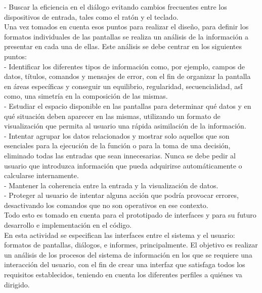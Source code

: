 -	Buscar la eficiencia en el diálogo evitando cambios frecuentes entre los dispositivos de entrada, tales como el ratón y el teclado.\\

\noindent Una vez tomados en cuenta esos puntos para realizar el diseño, para definir los formatos individuales de las pantallas se realiza un análisis de la información a presentar en cada una de ellas. Este análisis se debe centrar en los siguientes puntos:\\

-	Identificar los diferentes tipos de información como, por ejemplo, campos de datos, títulos, comandos y mensajes de error, con el fin de organizar la pantalla en áreas específicas y conseguir un equilibrio, regularidad, secuencialidad, así́ como, una simetría en la composición de las mismas.\\

-	Estudiar el espacio disponible en las pantallas para determinar qué datos y en qué situación deben aparecer en las mismas, utilizando un formato de visualización que permita al usuario una rápida asimilación de la información.\\

-	Intentar agrupar los datos relacionados y mostrar solo aquellos que son esenciales para la ejecución de la función o para la toma de una decisión, eliminado todas las entradas que sean innecesarias. Nunca se debe pedir al usuario que introduzca información que pueda adquirirse  automáticamente o calcularse internamente.\\

-	Mantener la coherencia entre la entrada y la visualización de datos.\\

-	Proteger al usuario de intentar alguna acción que podría provocar errores, desactivando los comandos que no son operativos en ese contexto.\\

\noindent Todo esto es tomado en cuenta para el prototipado de interfaces y para su futuro desarrollo e implementación en el código.\\

\noindent En esta actividad se especifican las interfaces entre el sistema y el usuario: formatos de
pantallas, diálogos, e informes, principalmente. El objetivo es realizar un análisis de los
procesos del sistema de información en los que se requiere una interacción del usuario, con el
fin de crear una interfaz que satisfaga todos los requisitos establecidos, teniendo en cuenta los
diferentes perfiles a quiénes va dirigido.\\

